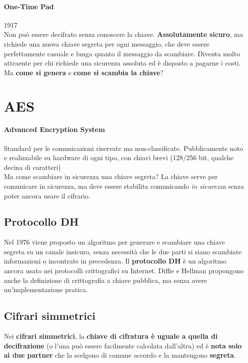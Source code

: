 \documentclass[10pt]{book}
\begin{document}
\paragraph{One-Time Pad} 1917\\
Non può essere decifrato senza conoscere la chiave. \textbf{Assolutamente sicuro}, ma richiede una nuova chiave segreta per ogni messaggio, che deve essere perfettamente casuale e lunga quanto il messaggio da scambiare. Diventa molto attraente per chi richiede una sicurezza assoluta ed è disposto a pagarne i costi.\\
Ma \textbf{come si genera} e \textbf{come si scambia la chiave}?
\section{AES} \paragraph{Advanced Encryption System} Standard per le comunicazioni riservate ma non-classificate. Pubblicamente noto e realizzabile su hardware di ogni tipo, con chiavi brevi (128/256 bit, qualche decina di caratteri)\\
Ma come scambiare in sicurezza una chiave segreta? La chiave serve per comunicare in sicurezza, ma deve essere stabilita comunicando \textit{in sicurezza} senza poter ancora usare il cifrario.
\subsection{Protocollo DH} Nel 1976 viene proposto un algoritmo per generare e scambiare una chiave segreta su un canale insicuro, senza necessità che le due parti si siano scambiate informazioni o incontrate in precedenza. Il \textbf{protocollo DH} è un algoritmo ancora usato nei protocolli crittografici su Internet. Diffie e Hellman propongono anche la definizione di crittografia a chiave pubblica, ma senza avere un'implementazione pratica.
\subsection{Cifrari simmetrici} Nei \textbf{cifrari simmetrici}, la \textbf{chiave di cifratura è uguale a quella di decifrazione} (o l'una può essere facilmente calcolata dall'altra) ed è \textbf{nota solo ai due partner} che la scelgono di comune accordo e la mantengono \textbf{segreta}.
\end{document}
